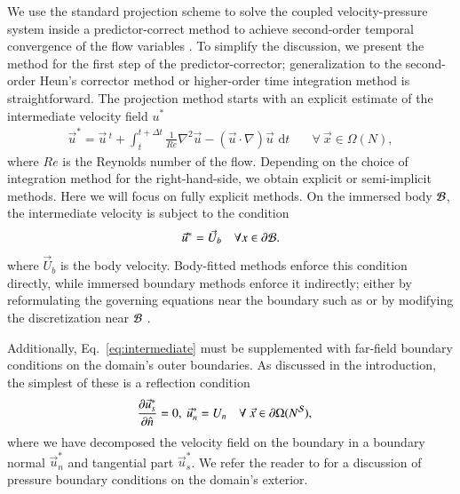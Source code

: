 \documentclass[preprint,12pt]{elsarticle}
\begin{document}
We use the standard projection scheme \cite{Chorin1967} to solve the coupled velocity-pressure system inside a predictor-correct method to achieve second-order temporal convergence of the flow variables \cite{Lauber2022}. 
To simplify the discussion, we present the method for the first step of the predictor-corrector; generalization to the second-order Heun's corrector method or higher-order time integration method is straightforward. The projection method starts with an explicit estimate of the intermediate velocity field $u^*$
\begin{align}\label{eq:intermediate}
    \vec{u}^* = \vec{u}\,^t + \int_{t}^{t+\Delta t}\frac{1}{Re}\nabla^2\vec{u} -\left(\vec{u}\cdot\nabla\right)\vec{u}\text{ d}t &\quad\forall\ \vec{x}\in\Omega (N),
\end{align}
where $Re$ is the Reynolds number of the flow. Depending on the choice of integration method for the right-hand-side, we obtain explicit or semi-implicit methods. Here we will focus on fully explicit methods. On the immersed body $
\cal B$, the intermediate velocity is subject to the condition
\begin{equation}
    \vec{u}^* = \vec{U}_b \quad \forall x \in \partial\cal{B}.
\end{equation} 
where $\vec{U}_b$ is the body velocity. Body-fitted methods enforce this condition directly, while immersed boundary methods enforce it indirectly; either by reformulating the governing equations near the boundary such as \cite{Peskin2010,Maertens2015} or by modifying the discretization near $\cal{B}$ \cite{Lee2015}.

Additionally, Eq.~\eqref{eq:intermediate} must be supplemented with far-field boundary conditions on the domain's outer boundaries. As discussed in the introduction, the simplest of these is a reflection condition
\begin{align}\label{eq:BC_1}
    \frac{\partial \vec{u}^*_s}{\partial \hat{n}} = 0,\ \vec{u}^*_n = U_n &\quad\forall\ \vec{x}\in\partial\Omega (N^{\cal S}),
\end{align}
where we have decomposed the velocity field on the boundary in a boundary normal $\vec{u}^*_n$ and tangential part $\vec{u}^*_s$. We refer the reader to \cite{Gresho1987} for a discussion of pressure boundary conditions on the domain's exterior.
\end{document}
